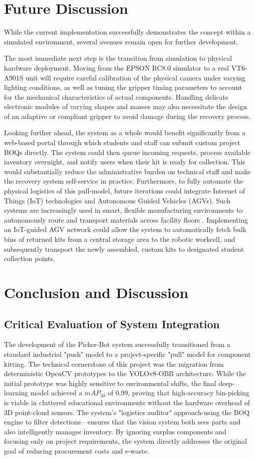 \documentclass[conference]{IEEEtran}
\begin{document}
\section{Future Discussion}
While the current implementation successfully demonstrates the concept within a simulated environment, several avenues remain open for further development.

The most immediate next step is the transition from simulation to physical hardware deployment. Moving from the EPSON RC8.0 simulator to a real VT6-A901S unit will require careful calibration of the physical camera under varying lighting conditions, as well as tuning the gripper timing parameters to account for the mechanical characteristics of actual components. Handling delicate electronic modules of varying shapes and masses may also necessitate the design of an adaptive or compliant gripper to avoid damage during the recovery process.

Looking further ahead, the system as a whole would benefit significantly from a web-based portal through which students and staff can submit custom project BOQs directly. The system could then queue incoming requests, process available inventory overnight, and notify users when their kit is ready for collection. This would substantially reduce the administrative burden on technical staff and make the recovery system self-service in practice. Furthermore, to fully automate the physical logistics of this pull-model, future iterations could integrate Internet of Things (IoT) technologies and Autonomous Guided Vehicles (AGVs). Such systems are increasingly used in smart, flexible manufacturing environments to autonomously route and transport materials across facility floors \cite{vlachos}. Implementing an IoT-guided AGV network could allow the system to automatically fetch bulk bins of returned kits from a central storage area to the robotic workcell, and subsequently transport the newly assembled, custom kits to designated student collection points.

\section{Conclusion and Discussion}
\subsection{Critical Evaluation of System Integration}
The development of the Picker-Bot system successfully transitioned from a standard industrial "push" model to a project-specific "pull" model for component kitting. The technical cornerstone of this project was the migration from deterministic OpenCV prototypes to the YOLOv8-OBB architecture. While the initial prototype was highly sensitive to environmental shifts, the final deep-learning model achieved a $mAP_{50}$ of 0.99, proving that high-accuracy bin-picking is viable in cluttered educational environments without the hardware overhead of 3D point-cloud sensors.
The system’s "logistics auditor" approach-using the BOQ engine to filter detections—ensures that the vision system both sees parts and also intelligently manages inventory. By ignoring surplus components and focusing only on project requirements, the system directly addresses the original goal of reducing procurement costs and e-waste.
\end{document}
